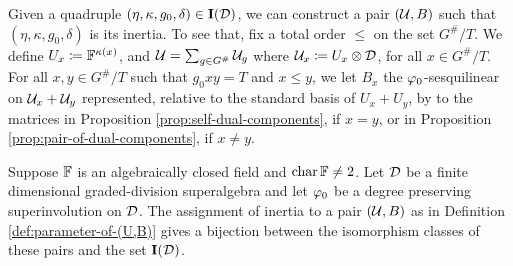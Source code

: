 Given a quadruple $(\eta, \kappa, g_0, \delta) \in \mathbf{I} (\mathcal{D})$, we can construct a pair $(\mathcal U, B)$ such that $(\eta, \kappa, g_0, \delta)$ is its inertia.
To see that, fix a total order $\leq$ on the set $G^\#/T$.
We define $U_x \coloneqq \mathbb{F}^{\kappa(x)}$, and $\mathcal U = \sum_{g \in G^\#} \mathcal U_g$ where $\mathcal U_x \coloneqq U_x \otimes \mathcal{D}$, for all $x\in G^\#/T$.
For all $x, y \in G^\#/T$ such that $g_0x y = T$ and $x \leq y$, we let $B_x$ the $\varphi_0$-sesquilinear on $\mathcal U_x + \mathcal U_y$ represented, relative to the standard basis of $U_x+U_y$, by to the matrices in Proposition \ref{prop:self-dual-components}, if $x=y$, or in Proposition \ref{prop:pair-of-dual-components}, if $x\neq y$.

\begin{thm}\label{thm:iso-(U,B)}
	Suppose $\mathbb{F}$ is an algebraically closed field and $\operatorname{char} \mathbb{F} \neq 2$.
	Let $\mathcal{D}$ be a finite dimensional graded-division superalgebra and let $\varphi_0$ be a degree preserving superinvolution on $\mathcal{D}$.
	The assignment of inertia to a pair $(\mathcal U, B)$ as in Definition \ref{def:parameter-of-(U,B)} gives a bijection between the isomorphism classes of these pairs and the set $\mathbf{I} (\mathcal{D})$.
\end{thm}

